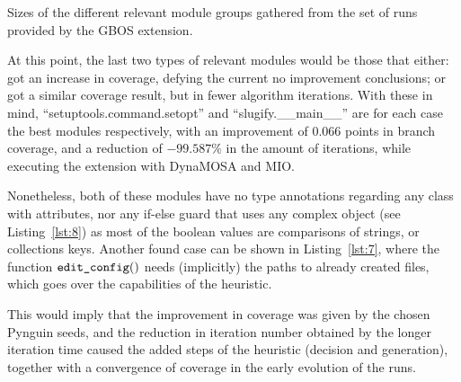 \documentclass[%
  chapterprefix=false,%
  open=right,%
  twoside=true,%
  paper=a4,%
  logofile={Figures/logo.png},%
  thesistype=master,%
  UKenglish,%
]{se2thesis}
\newcommand{\callable}[2][]{\(\text{\texttt{#2}}(#1)\)}
\begin{document}
\begin{table}[t]
  \centering
  
\caption{Sizes of the different relevant module groups gathered from the set of runs provided by the GBOS extension.}\label{tab:flag_modules}
\end{table}

At this point, the last two types of relevant modules would be those that either: got an increase in coverage, defying the current no improvement conclusions; or got a similar coverage result, but in fewer algorithm iterations.
With these in mind, ``setuptools.command.setopt'' and ``slugify.\_\_main\_\_'' are for each case the best modules respectively, with an improvement of \(0.066\) points in branch coverage, and a reduction of \(-99.587\%\) in the amount of iterations, while executing the extension with DynaMOSA and MIO.\@

Nonetheless, both of these modules have no type annotations regarding any class with attributes, nor any if-else guard that uses any complex object (see Listing~\ref{lst:8}) as most of the boolean values are comparisons of strings, or collections keys.
Another found case can be shown in Listing~\ref{lst:7}, where the function \callable[]{edit\_config} needs (implicitly) the paths to already created files, which goes over the capabilities of the heuristic.

This would imply that the improvement in coverage was given by the chosen Pynguin seeds, and the reduction in iteration number obtained by the longer iteration time caused the added steps of the heuristic (decision and generation), together with a convergence of coverage in the early evolution of the runs.
\end{document}
